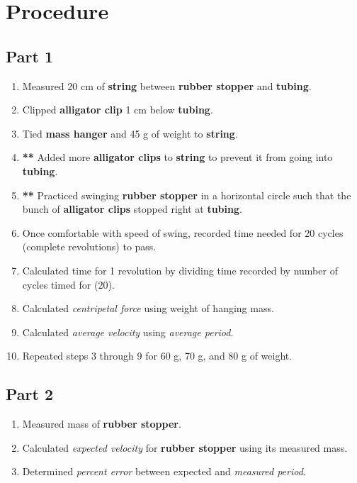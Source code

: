 
\section{Procedure}
\vspace{-0.5cm}
\singlespacing



\subsection{Part 1}

\begin{enumerate}
		\item Measured 20 cm of \textbf{string} between \textbf{rubber stopper }and
			\textbf{tubing}.

		\item Clipped \textbf{alligator clip }1 cm below \textbf{tubing}.

		\item Tied \textbf{mass hanger }and 45 g of weight to \textbf{string}.

		\item \textbf{**} Added more \textbf{alligator clips }to \textbf{string }to prevent it
			from going into \textbf{tubing}.

		\item \textbf{**} Practiced swinging \textbf{rubber stopper }in a horizontal circle such
			that the bunch of \textbf{alligator clips }stopped right at \textbf{tubing}.

		\item Once comfortable with speed of swing, recorded time needed for 20
			cycles (complete revolutions) to pass.

		\item Calculated time for 1 revolution by dividing time recorded by number of
			cycles timed for (20).

		\item Calculated \emph{centripetal force }using weight of hanging mass.

		\item Calculated \emph{average velocity }using \emph{average period}.

		\item Repeated steps 3 through 9 for 60 g, 70 g, and 80 g of weight.
	\end{enumerate}

	\subsection{Part 2}
	\begin{enumerate}[resume]
			\item Measured mass of \textbf{rubber stopper}.			
			\item Calculated \emph{expected velocity} for \textbf{rubber stopper} using its measured mass.
			\item Determined \emph{percent error} between expected and \emph{measured period}.
	\end{enumerate}


